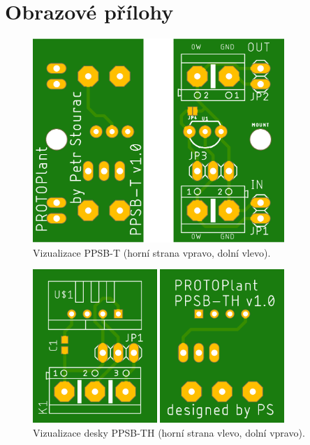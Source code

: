 \chapter{Obrazové přílohy}

\begin{figure}[h]
    \centering
    \includegraphics[width=0.85\textwidth]{img/HARDWARE/PPSB-T_BOTH.png}
    \caption{Vizualizace PPSB-T (horní strana vpravo, dolní vlevo).}
    \label{fig:PPSB-T_VISUAL}
\end{figure}

\begin{figure}[h]
    \centering
    \includegraphics[width=0.85\textwidth]{img/HARDWARE/PPSB-TH_BOTH.png}
    \caption{Vizualizace desky PPSB-TH (horní strana vlevo, dolní vpravo).}
    \label{fig:PPSB-TH_VISUAL}
\end{figure}

